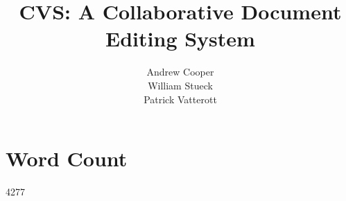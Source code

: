 \documentclass{6033dp1/6033dp1}
\title{CVS: A Collaborative Document Editing System}
\author{Andrew Cooper\\ William Stueck\\ Patrick Vatterott}
\begin{document}
\maketitle















\section{Word Count}
4277
\end{document}
